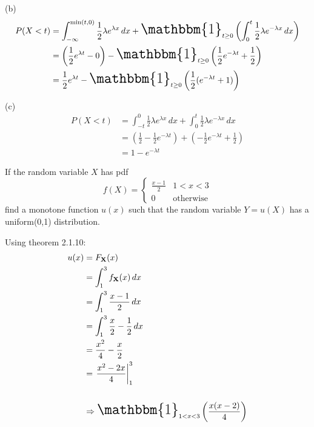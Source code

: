 \documentclass[12pt,letterpaper]{exam}
\begin{document}
\begin{questions}
\begin{solution}
		(b)
		\begin{align*}
			P(X<t)
			&= \int_{-\infty}^{\min(t,0)} \frac{1}{2}\lambda e^{\lambda x} \,dx 
			+ \text{\LARGE $\mathbbm{1}$}_{t\geq0} \left( \int_{0}^{t} \frac{1}{2}\lambda e^{-\lambda x} \,dx\right)  \\
			&=  \left( \frac{1}{2} e^{\lambda t} - 0 \right)
			- \text{\LARGE $\mathbbm{1}$}_{t\geq0} \left( \frac{1}{2} e^{-\lambda t} + \frac{1}{2} \right)  \\
			&=  \frac{1}{2} e^{\lambda t}
			- \text{\LARGE $\mathbbm{1}$}_{t\geq0}  \left( \frac{1}{2} (e^{-\lambda t} + 1) \right)  \\
		\end{align*}
		
		(c)
		\begin{align*}
			P(X<t)
			&= \int_{-t}^{0} \frac{1}{2}\lambda e^{\lambda x} \,dx + \int_{0}^{t} \frac{1}{2}\lambda e^{-\lambda x} \,dx  \\
			&= \left( \frac{1}{2} - \frac{1}{2} e^{-\lambda t} \right) + \left( -\frac{1}{2} e^{-\lambda t} + \frac{1}{2} \right)  \\
			&= 1 - e^{-\lambda t}
		\end{align*}
		
	\end{solution}
	\clearpage
	
	\setcounter{question}{8}
	\question  If the random variable $X$ has pdf $$f(X) = \begin{cases}\frac{x-1}{2} & 1<x<3 \\ 0 & \text{otherwise} \end{cases}$$
	find a monotone function $u(x)$ such that the random variable $Y = u(X)$ has a uniform(0,1) distribution.
	\begin{solution}
		
			Using theorem 2.1.10:
		\begin{align*}
			u(x) &= F_{\mathbf X}(x) \\
			&= \int_{1}^{3} f_\mathbf{X}(x) \,dx \\
			&= \int_{1}^{3} \frac{x-1}{2} \,dx \\
			&= \int_{1}^{3} \frac{x}{2}-\frac{1}{2} \,dx \\
			&= \frac{x^2}{4}-\frac{x}{2} \\
			&= \left. \frac{x^2-2x}{4} \right|_1^3 \\ \\
			&\Rightarrow \text{\LARGE $\mathbbm{1}$}_{1<x<3} \left( \frac{x(x-2)}{4} \right)
		\end{align*}
	\end{solution}


\end{questions}
\end{document}
